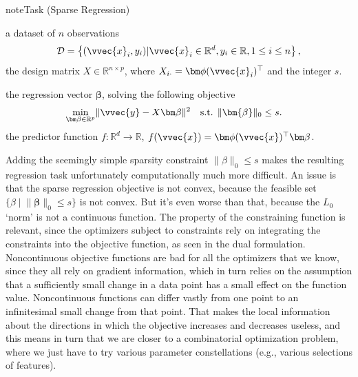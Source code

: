 \documentclass[letterpaper,10pt,english]{jupyterBook}
\begin{document}
\begin{sphinxadmonition}{note}{Task (Sparse Regression)}

\sphinxAtStartPar
{} a dataset of \(n\) observations
\begin{equation*}\mathcal{D}=\left\{(\vvec{x}_i,y_i)\vert \vvec{x}_i\in\mathbb{R}^{d}, y_i\in\mathbb{R}, 1\leq i \leq n\right\},\end{equation*}
\sphinxAtStartPar
the design matrix \(X\in\mathbb{R}^{n\times p}\), where \(X_{i\cdot}=\bm\phi(\vvec{x}_i)^\top\) and the integer \(s\).

\sphinxAtStartPar
{} the regression vector \(\bm\beta\), solving the following objective
\label{equation:regression_sparse:2234f0e4-f581-4b66-97ee-e79a2183b321}\begin{align}
    \min_{\bm\beta\in\mathbb{R}^p} & \lVert \vvec{y}-X\bm\beta\rVert^2 &
    \text{s.t. }& \lVert\bm{\beta}\rVert_0\leq s.
\end{align}
\sphinxAtStartPar
{} the predictor function \(f:\mathbb{R}^d\rightarrow\mathbb{R}\), \(f(\vvec{x})=\bm\phi(\vvec{x})^\top\bm\beta\).
\end{sphinxadmonition}

\sphinxAtStartPar
Adding the seemingly simple sparsity constraint \(\lVert\beta\rVert_0\leq s\) makes the resulting regression task unfortunately computationally much more difficult. An issue is that the sparse regression objective is not convex, because the feasible set \(\{\beta\mid \lVert\bm{\beta}\rVert_0\leq s\}\) is not convex. But it’s even worse than that, because the \(L_0\)\sphinxhyphen{}‘norm’ is not a continuous function. The property of the constraining function is relevant, since the optimizers subject to constraints rely on integrating the constraints into the objective function, as seen in the dual formulation. Noncontinuous objective functions are bad for all the optimizers that we know, since they all rely on gradient information, which in turn relies on the assumption that a sufficiently small change in a data point has a small effect on the function value. Noncontinuous functions can differ vastly from one point to an infinitesimal small change from that point. That makes the local information about the directions in which the objective increases and decreases useless, and this means in turn that we are closer to a combinatorial optimization problem, where we just have to try various parameter constellations (e.g., various selections of features).
\end{document}
